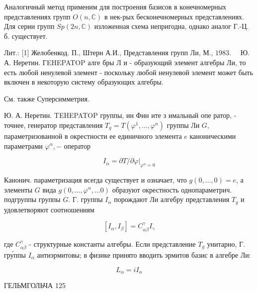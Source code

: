 \documentclass[10pt]{article}
\begin{document}
Аналогичный метод применим для построения базисов в конечномерных представлениях групп $O(n, \mathbb{C})$ в нек-рых бесконечномерных представлениях. Для серии групп $S p(2 n, \mathbb{C})$ изложенная схема непригодна, однако аналог Г.-Ц. б. существует.



Лит.: [1] Желобенкод. П., Штерн А.И., Представления групп Ли, М., $1983 . \quad$ Ю. А. Неретин. ГEHEPATOP алге бры Л и - образующий элемент алгебры Ли, то есть любой ненулевой элемент - поскольку любой ненулевой элемент может быть включен в некоторую систему образующих алгебры.



См. также Суперсимметрия.



Ю. А. Неретин. TEHEPATOP группы, ин Фин ите $з$ имальный опе ратор, - точнее, генератор представления $T_{g}=T\left(\varphi^{1}, \ldots, \varphi^{n}\right)$ группы Ли $G$, параметризованной в окрестности ее единичного элемента $e$ каноническими параметрами $\varphi^{\alpha},-$ оператор



\[

I_{\alpha}=\partial T /\left.\partial \varphi\right|_{\varphi^{\alpha}=0}

\]



Канонич. параметризация всегда существует и означает, что $g(0, \ldots, 0)=e$, а элементы $G$ вида $g\left(0, \ldots, \varphi^{\alpha}, \ldots 0\right)$ образуют окрестность однопараметрич. подгруппы группы $G$. Г. группы $I_{\alpha}$ порождают Ли алгебру представления $T_{g}$ и удовлетворяют соотношениям



\[

\left[I_{\alpha}, I_{\beta}\right]=C_{\alpha \beta}^{\gamma} I_{\gamma}

\]



где $C_{\alpha \beta}^{\gamma}$ - структурные константы алгебры. Если представление $T_{g}$ унитарно, Г. гру́ппы $I_{\alpha}$ антиэрмитовы; в физике принято вводить эрмитов базис в алгебре Ли:



\[

L_{\alpha}=i I_{\alpha}

\]



ГЕЛЬМГОЛЬЧА 125
\end{document}
